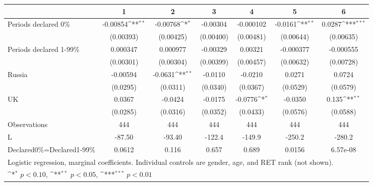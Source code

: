 {
\def\sym#1{\ifmmode^{#1}\else\(^{#1}\)\fi}
\begin{tabular}{l*{6}{c}}
\hline\hline
                &\multicolumn{1}{c}{1}&\multicolumn{1}{c}{2}&\multicolumn{1}{c}{3}&\multicolumn{1}{c}{4}&\multicolumn{1}{c}{5}&\multicolumn{1}{c}{6}\\
\hline
Periods declared 0\%& -0.00854\sym{**} & -0.00768\sym{*}  & -0.00304         &-0.000102         &  -0.0161\sym{**} &   0.0287\sym{***}\\
                &(0.00393)         &(0.00425)         &(0.00400)         &(0.00481)         &(0.00644)         &(0.00635)         \\
Periods declared 1-99\%& 0.000347         & 0.000977         & -0.00329         &  0.00321         &-0.000377         &-0.000555         \\
                &(0.00301)         &(0.00304)         &(0.00399)         &(0.00457)         &(0.00632)         &(0.00728)         \\
Russia          & -0.00594         &  -0.0631\sym{**} &  -0.0110         &  -0.0210         &   0.0271         &   0.0724         \\
                & (0.0295)         & (0.0311)         & (0.0340)         & (0.0367)         & (0.0529)         & (0.0579)         \\
UK              &   0.0367         &  -0.0424         &  -0.0175         &  -0.0776\sym{*}  &  -0.0350         &    0.135\sym{**} \\
                & (0.0285)         & (0.0316)         & (0.0352)         & (0.0433)         & (0.0576)         & (0.0588)         \\
\hline
Observations    &      444         &      444         &      444         &      444         &      444         &      444         \\
L               &   -87.50         &   -93.40         &   -122.4         &   -149.9         &   -250.2         &   -280.2         \\
Declared\space{}0\%=Declared\space{}1-99\%&   0.0612         &    0.116         &    0.657         &    0.689         &   0.0156         & 6.57e-08         \\
\hline\hline
\multicolumn{7}{l}{\footnotesize Logistic regression, marginal coefficients. Individual controls are gender, age, and RET rank (not shown).}\\
\multicolumn{7}{l}{\footnotesize \sym{*} \(p<0.10\), \sym{**} \(p<0.05\), \sym{***} \(p<0.01\)}\\
\end{tabular}
}
